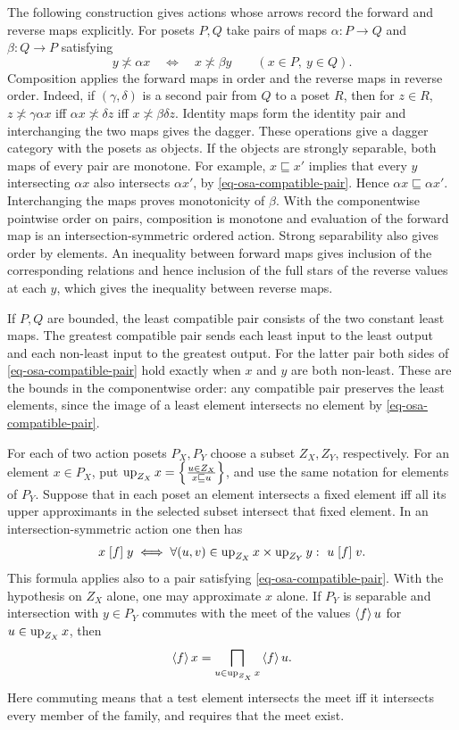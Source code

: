 The following construction gives actions whose arrows record the forward
and reverse maps explicitly. For posets $P,Q$ take pairs of maps
$\alpha:P\to Q$ and $\beta:Q\to P$ satisfying
\begin{equation}\label{eq-osa-compatible-pair}
 y\nasymp\alpha x\quad\Longleftrightarrow\quad x\nasymp\beta y
 \qquad(x\in P,\ y\in Q).
\end{equation}
Composition applies the forward maps in order and the reverse maps in
reverse order. Indeed, if $(\gamma,\delta)$ is a second pair from $Q$ to
a poset $R$, then for $z\in R$,
$z\nasymp\gamma\alpha x$ iff $\alpha x\nasymp\delta z$ iff
$x\nasymp\beta\delta z$. Identity maps form the identity pair and
interchanging the two maps gives the dagger. These operations give a
dagger category with the posets as objects. If the objects are strongly
separable, both maps of every pair are monotone. For example,
$x\sqsubseteq x'$ implies that every $y$ intersecting $\alpha x$ also
intersects $\alpha x'$, by \eqref{eq-osa-compatible-pair}. Hence
$\alpha x\sqsubseteq\alpha x'$. Interchanging the maps proves monotonicity
of $\beta$. With the componentwise pointwise order on pairs, composition
is monotone and evaluation of the forward map is an intersection-symmetric
ordered action. Strong separability also gives order by elements. An
inequality between forward maps gives inclusion of the corresponding
relations and hence inclusion of the full stars of the reverse values
at each $y$, which gives the inequality between reverse maps.

If $P,Q$ are bounded, the least compatible pair consists of the
two constant least maps. The greatest compatible pair sends each
least input to the least output and each non-least input to the
greatest output. For the latter pair both sides of
\eqref{eq-osa-compatible-pair} hold exactly when $x$ and $y$ are
both non-least. These are the bounds in the componentwise order:
any compatible pair preserves the least elements, since the image
of a least element intersects no element by
\eqref{eq-osa-compatible-pair}.

\begin{prop}\label{prop-osa-core-recovery}
For each of two action posets $P_X,P_Y$ choose a subset $Z_X,Z_Y$,
respectively. For an element $x\in P_X$, put
$\operatorname{up}_{Z_X}x=\left\{ \frac{u\in Z_X}{x\sqsubseteq u}\right\}$, and use the same
notation for elements of $P_Y$. Suppose that in each poset an
element intersects a fixed element iff all its upper approximants
in the selected subset intersect that fixed element. In an
intersection-symmetric action one then has
\[
 x\mathrel{\left[f\right]}y
 \iff
 \forall(u,v)\in \operatorname{up}_{Z_X}x\times\operatorname{up}_{Z_Y}y:\ u\mathrel{\left[f\right]}v.
\]
This formula applies also to a pair satisfying
\eqref{eq-osa-compatible-pair}. With the hypothesis on $Z_X$ alone,
one may approximate $x$ alone. If $P_Y$ is separable and
intersection with $y\in P_Y$ commutes with the meet of the
values $\left\langle f\right\rangle u$ for $u\in\operatorname{up}_{Z_X}x$, then
\[
 \left\langle f\right\rangle x=\bigsqcap_{u\in\operatorname{up}_{Z_X}x}\left\langle f\right\rangle u.
\]
Here commuting means that a test element intersects the meet iff
it intersects every member of the family, and requires that the
meet exist.
\end{prop}

